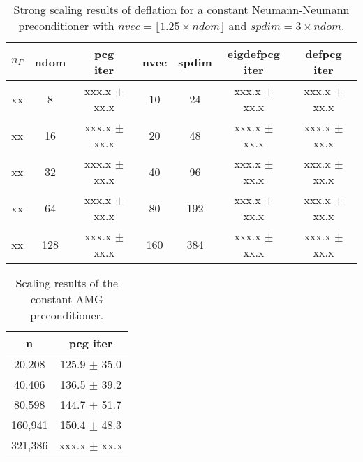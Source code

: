 \documentclass{article}
\begin{document}
\begin{table}[ht]
	\caption{Strong scaling results of deflation for a constant Neumann-Neumann preconditioner with $nvec=\lfloor1.25\times ndom\rfloor$ and $spdim=3\times ndom$.}
	\centering
	\begin{tabular}{|c|c|c|c|c|c|c|}
		\hline
		$n_\Gamma$ & ndom & \makecell{pcg\\ iter} & nvec & spdim & \makecell{eigdefpcg\\ iter} & \makecell{defpcg\\ iter}\\
		\hline
		xx  &   8 & xxx.x $\pm$  xx.x &  10 &  24 & xxx.x $\pm$ xx.x & xxx.x $\pm$ xx.x \\
		xx  &  16 & xxx.x $\pm$  xx.x &  20 &  48 & xxx.x $\pm$ xx.x & xxx.x $\pm$ xx.x \\
		xx  &  32 & xxx.x $\pm$  xx.x &  40 &  96 & xxx.x $\pm$ xx.x & xxx.x $\pm$ xx.x \\
		xx  &  64 & xxx.x $\pm$  xx.x &  80 & 192 & xxx.x $\pm$ xx.x & xxx.x $\pm$ xx.x \\
		xx  & 128 & xxx.x $\pm$  xx.x & 160 & 384 & xxx.x $\pm$ xx.x & xxx.x $\pm$ xx.x \\
		\hline
	\end{tabular}
	\label{Tab:040}
\end{table}


\begin{table}[ht]
	\caption{Scaling results of the constant AMG preconditioner.}
	\centering
	\begin{tabular}{|c|c|}
		\hline
		n & pcg iter \\
		\hline
		20,208  & 125.9 $\pm$ 35.0 \\
		40,406  & 136.5 $\pm$ 39.2  \\
		80,598  & 144.7 $\pm$ 51.7  \\
		160,941 & 150.4 $\pm$ 48.3  \\
		321,386 & xxx.x $\pm$ xx.x  \\
		\hline
	\end{tabular}
	\label{Tab:020}
\end{table}
\end{document}

